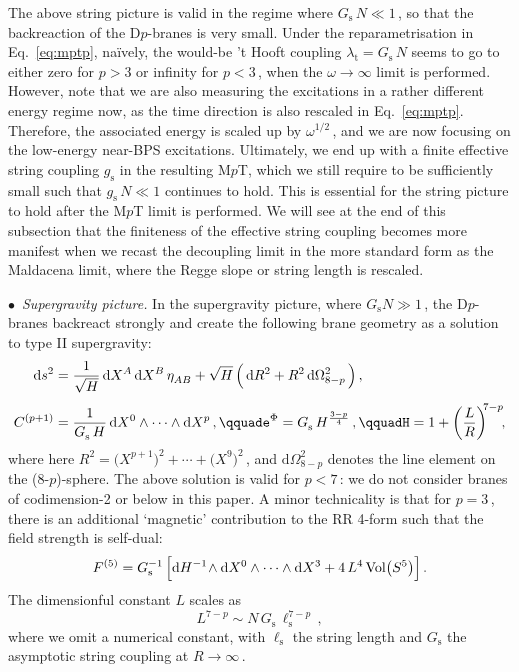 \documentclass[11pt]{article}
\newcommand{\be}{\begin{equation}}
\newcommand{\ee}{\end{equation}}
\renewcommand{\emph}[1]{\textit{#1}}
\newcommand{\dd}{\mathrm{d}}
\begin{document}
The above string picture is valid in the regime where $G_\text{s} \, N \ll 1$\,, so that the backreaction of the D$p$-branes is very small. Under the reparametrisation in Eq.~\eqref{eq:mptp}, na\"{i}vely, the would-be 't Hooft coupling $\lambda^{}_\text{t} = G^{}_\text{s} \, N$ seems to go to either zero for $p > 3$ or infinity for $p < 3$\,, when the $\omega \rightarrow \infty$ limit is performed. However, note that we are also measuring the excitations in a rather different energy regime now, as the time direction is also rescaled in Eq.~\eqref{eq:mptp}. Therefore, the associated energy is scaled up by $\omega^{1/2}$\,, and we are now focusing on the low-energy near-BPS excitations. Ultimately, we end up with a finite effective string coupling $g^{}_\text{s}$ in the resulting M$p$T, which we still require to be sufficiently small such that $g^{}_\text{s} \, N \ll 1$ continues to hold. This is essential for the string picture to hold after the M$p$T limit is performed. We will see at the end of this subsection that the finiteness of the effective string coupling becomes more manifest when we recast the decoupling limit in the more standard form as the Maldacena limit, where the Regge slope or string length is rescaled. 

\vspace{3mm}

\noindent $\bullet$~\emph{Supergravity picture.} In the supergravity picture, where $G_\text{s} N \gg 1$\,, the D$p$-branes backreact strongly and create the following brane geometry as a solution to type II supergravity:
%
\begin{subequations} \label{eq:dpbg}
\begin{align}
    \dd s^2 & = \frac{1}{\sqrt{H}} \, \dd X^A \, \dd X^B \, \eta^{}_{AB}
    + \sqrt{H} \, \Bigl( \, \dd R^2 + R^2 \, \dd\Omega^2_{8-p} \, \Bigr)\,, \\[4pt]
    C^{(p+1)} & = \frac{1}{G^{}_\text{s} \, H} \, \dd X^0 \wedge \cdots \wedge \dd X^p\,,
        \qquad%
    e^\Phi = G^{}_\text{s} \, H^{\frac{3-p}{4}}\,,
        \qquad%
    H = 1 + \left( \frac{L}{R} \right)^{\!\!7-p}\!\!, 
\end{align}
\end{subequations}
%
where here $R^2 = \bigl( X^{p+1} \bigr)^2 + \cdots + \bigl( X^9 \bigr)^2$\,, and $\dd\Omega^2_{8-p}$ denotes the line element on the (8-$p$)-sphere. The above solution is valid for $p<7$\,: we do not consider branes of codimension-2 or below in this paper.
A minor technicality is that for $p=3$\,, there is an additional `magnetic' contribution to the RR 4-form such that the field strength is self-dual:
\be
F^{(5)} 
 =
G_\text{s}^{-1} \, \Bigl[ \dd H^{-1} \! \wedge \dd X^0\wedge \cdots \wedge \dd X^3 
+  4 \, L^4 \, \mathrm{Vol}\bigl(S^5\bigr) \Bigr]\,.
\label{F5general}
\ee
The dimensionful constant $L$ scales as 
%
\be \label{eq:lsp}
    L^{7-p} \sim N \, G^{}_\text{s} \, \ell_\text{s}^{7-p}\,,
\ee
%
where we omit a numerical constant, with $\ell^{}_\text{s}$ the string length and $G^{}_\text{s}$ the asymptotic string coupling at $R \rightarrow \infty$\,. 
\end{document}
